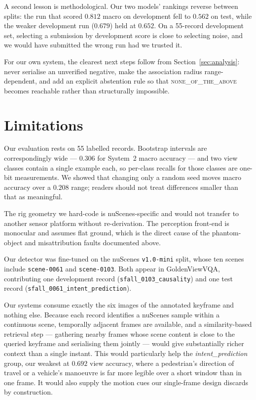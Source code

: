 \documentclass[11pt]{article}
\begin{document}
A second lesson is methodological. Our two models' rankings reverse between
splits: the run that scored $0.812$ macro on development fell to $0.562$ on
test, while the weaker development run ($0.679$) held at $0.652$. On a
55-record development set, selecting a submission by development score is
close to selecting noise, and we would have submitted the wrong run had we
trusted it.

For our own system, the clearest next steps follow from
Section~\ref{sec:analysis}: never serialise an unverified negative, make the
association radius range-dependent, and add an explicit abstention rule so that
\textsc{none\_of\_the\_above} becomes reachable rather than structurally
impossible.

\section*{Limitations}

Our evaluation rests on 55 labelled records. Bootstrap intervals are
correspondingly wide --- $0.306$ for System~2 macro accuracy --- and two view
classes contain a single example each, so per-class recalls for those classes
are one-bit measurements. We showed that changing only a random seed moves
macro accuracy over a $0.208$ range; readers should not treat differences
smaller than that as meaningful.

The rig geometry we hard-code is nuScenes-specific and would not transfer to
another sensor platform without re-derivation. The perception front-end is
monocular and assumes flat ground, which is the direct cause of the
phantom-object and misattribution faults documented above.

Our detector was fine-tuned on the nuScenes \texttt{v1.0-mini} split, whose ten
scenes include \texttt{scene-0061} and \texttt{scene-0103}. Both appear in
GoldenViewVQA, contributing one development record
(\texttt{sfall\_0103\_causality}) and one test record
(\texttt{sfall\_0061\_intent\_prediction}).

Our systems consume exactly the six images of the annotated keyframe and
nothing else. Because each record identifies a nuScenes sample within a
continuous scene, temporally adjacent frames are available, and a
similarity-based retrieval step --- gathering nearby frames whose scene content
is close to the queried keyframe and serialising them jointly --- would give
substantially richer context than a single instant. This would particularly
help the \textit{intent\_prediction} group, our weakest at $0.692$ view
accuracy, where a pedestrian's direction of travel or a vehicle's manoeuvre is
far more legible over a short window than in one frame. It would also supply
the motion cues our single-frame design discards by construction.
\end{document}

